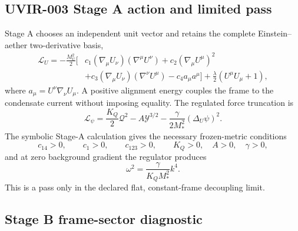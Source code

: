 \subsection{UVIR-003 Stage A action and limited pass}

Stage A chooses an independent unit vector and retains the complete
Einstein--aether two-derivative basis,
\begin{align}
 \mathcal L_U=-\frac{M_U^2}{2}\big[&c_1(\nabla_\mu U_\nu)(\nabla^\mu U^\nu)
 +c_2(\nabla_\mu U^\mu)^2 \nonumber\\
 &+c_3(\nabla_\mu U_\nu)(\nabla^\nu U^\mu)-c_4a_\mu a^\mu\big]
 +\frac{\lambda}{2}(U^\mu U_\mu+1),
 \label{eq:aether-action}
\end{align}
where $a_\mu=U^\nu\nabla_\nu U_\mu$.  A positive alignment energy couples
the frame to the condensate current without imposing equality.  The regulated
force truncation is
\begin{equation}
 \mathcal L_\psi=\frac{K_Q}{2}\mathcal Q^2-A\mathcal Y^{3/2}
 -\frac{\gamma}{2M_*^2}(\Delta_U\psi)^2.
 \label{eq:stage-a-force}
\end{equation}
The symbolic Stage-A calculation gives the necessary frozen-metric conditions
\begin{equation}
 c_{14}>0,\qquad c_1>0,\qquad c_{123}>0,
 \qquad K_Q>0,\quad A>0,\quad\gamma>0,
 \label{eq:stage-a-signs}
\end{equation}
and at zero background gradient the regulator produces
\begin{equation}
 \omega^2=\frac{\gamma}{K_QM_*^2}k^4.
 \label{eq:k4-dispersion}
\end{equation}
This is a pass only in the declared flat, constant-frame decoupling limit.

\subsection{Stage B frame-sector diagnostic}

